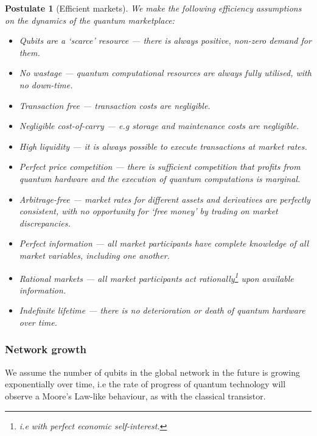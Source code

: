 \documentclass[aps, rmp, twocolumn, amsmath, amssymb, nofootinbib, superscriptaddress, longbibliography, floatfix, table-of-contents, eqsecnum]{revtex4-1}
\newtheorem{postulate}{Postulate}
\begin{document}
\begin{postulate}[Efficient markets]\label{post:market_eff} We make the following efficiency assumptions on the dynamics of the quantum marketplace:
\begin{itemize}
	\item Qubits are a `scarce' resource --- there is always positive, non-zero demand for them.
	\item No wastage --- quantum computational resources are always fully utilised, with no down-time.
	\item Transaction free --- transaction costs are negligible.
	\item Negligible cost-of-carry --- e.g storage and maintenance costs are negligible.
	\item High liquidity --- it is always possible to execute transactions at market rates.
	\item Perfect price competition --- there is sufficient competition that profits from quantum hardware and the execution of quantum computations is marginal.
	\item Arbitrage-free --- market rates for different assets and derivatives are perfectly consistent, with no opportunity for `free money' by trading on market discrepancies.
	\item Perfect information --- all market participants have complete knowledge of all market variables, including one another.
	\item Rational markets --- all market participants act rationally\footnote{i.e with perfect economic self-interest.} upon available information.
	\item Indefinite lifetime --- there is no deterioration or death of quantum hardware over time.
\end{itemize}
\end{postulate}

%
%

\subsubsection{Network growth} 

We assume the number of qubits in the global network in the future is growing exponentially over time, i.e the rate of progress of quantum technology will observe a Moore's Law-like behaviour, as with the classical transistor.
\end{document}
